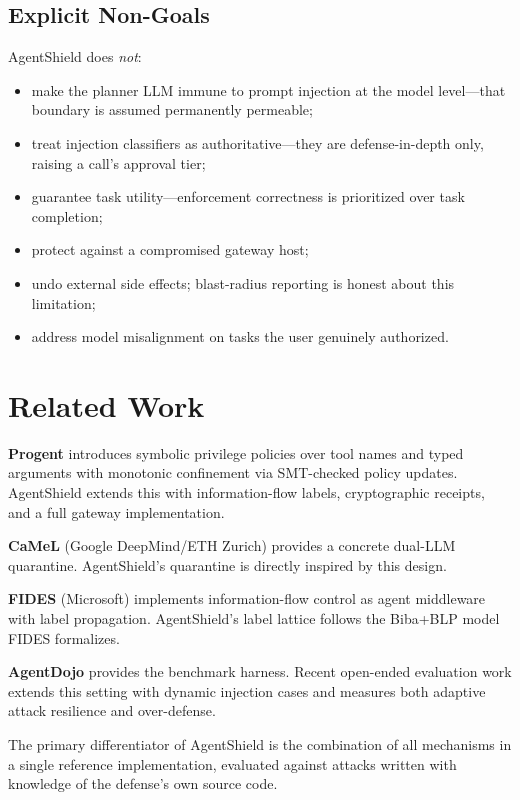 \documentclass[10pt,conference]{IEEEtran}
\begin{document}
\subsection{Explicit Non-Goals}

AgentShield does \emph{not}:
\begin{itemize}
  \item make the planner LLM immune to prompt injection at the model
        level---that boundary is assumed permanently permeable;
  \item treat injection classifiers as authoritative---they are
        defense-in-depth only, raising a call's approval tier;
  \item guarantee task utility---enforcement correctness is prioritized
        over task completion;
  \item protect against a compromised gateway host;
  \item undo external side effects; blast-radius reporting is honest about
        this limitation;
  \item address model misalignment on tasks the user genuinely authorized.
\end{itemize}

\section{Related Work}

\textbf{Progent} \cite{progent2025} introduces symbolic privilege policies over
tool names and typed arguments with monotonic confinement via SMT-checked
policy updates. AgentShield extends this with information-flow labels,
cryptographic receipts, and a full gateway implementation.

\textbf{CaMeL} \cite{camel2025} (Google DeepMind/ETH Zurich) provides a
concrete dual-LLM quarantine. AgentShield's quarantine is directly inspired
by this design.

\textbf{FIDES} \cite{fides2025} (Microsoft) implements information-flow
control as agent middleware with label propagation. AgentShield's label
lattice follows the Biba+BLP model FIDES formalizes.

\textbf{AgentDojo} \cite{agentdojo2024} provides the benchmark harness.
Recent open-ended evaluation work extends this setting with dynamic injection
cases and measures both adaptive attack resilience and over-defense.

The primary differentiator of AgentShield is the combination of all mechanisms
in a single reference implementation, evaluated against attacks written with
knowledge of the defense's own source code.
\end{document}
